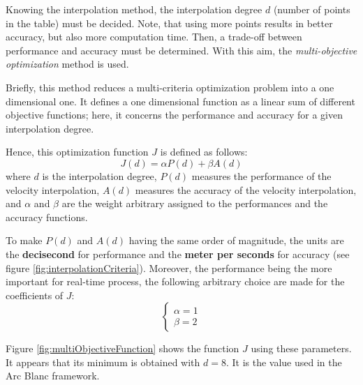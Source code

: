 \documentclass[final]{jcgt}
\def\framework{the Arc Blanc framework\xspace}
\begin{document}
Knowing the interpolation method, the interpolation degree $d$ (number of points in the table) must be decided.
Note, that using more points results in better accuracy, but also more computation time.
Then, a trade-off between performance and accuracy must be determined.
With this aim, the \textit{multi-objective optimization} method is used.

Briefly, this method reduces a multi-criteria optimization problem into a one dimensional one.
It defines a one dimensional function as a linear sum of different objective functions; here, it concerns the performance and accuracy for a given interpolation degree.

Hence, this optimization function $J$ is defined as follows:
\begin{equation}
	J(d) = \alpha P(d) + \beta A(d)
\end{equation}
where $d$ is the interpolation degree, $P(d)$ measures the performance of the velocity interpolation, $A(d)$ measures the accuracy of the velocity interpolation, and $\alpha$ and $\beta$ are the weight arbitrary assigned to the performances and the accuracy functions.

To make $P(d)$ and $A(d)$ having the same order of magnitude, the units are the \textbf{decisecond} for performance and the \textbf{meter per seconds} for accuracy (see figure \ref{fig:interpolationCriteria}).
Moreover, the performance being the more important for real-time process, the following arbitrary choice are made for the coefficients of $J$:
\begin{equation}
	\begin{cases}
		\alpha = 1 \\
		\beta = 2
	\end{cases}
\end{equation}

Figure \ref{fig:multiObjectiveFunction} shows the function $J$ using these parameters. It appears that its minimum is obtained with $d=8$.
It is the value used in \framework.
\end{document}
